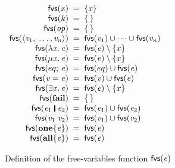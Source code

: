 \begin{figure}
$
\begin{array}{r@{\;\;}c@{\;\;}l@{\qquad}l}
  \freevars{\ensuremath{\Varid{x}}} & = & \{ \ensuremath{\Varid{x}} \} \\
  \freevars{\ensuremath{\Varid{k}}} & = & \{\,\} \\
  \freevars{\ensuremath{\Varid{op}}} & = & \{\,\} \\
  \freevars{\ensuremath{\langle{}\Varid{v}_{\mathrm{1}},\;\ldots,\Varid{v}_{\Varid{n}}\rangle}} & = & \freevars{\ensuremath{\Varid{v}_{\mathrm{1}}}} \cup \cdots \cup \freevars{\ensuremath{\Varid{v}_{\Varid{n}}}} \\
  \freevars{\ensuremath{\lambda\Varid{x}.\,\Varid{e}}} & = & \freevars{\ensuremath{\Varid{e}}} \setminus \{ x \} \\
  \freevars{\ensuremath{\mu\Varid{x}.\,\Varid{e}}} & = & \freevars{\ensuremath{\Varid{e}}} \setminus \{ x \} \\
  \freevars{\ensuremath{eq;\,\Varid{e}}} & = & \freevars{\ensuremath{eq}} \cup \freevars{\ensuremath{\Varid{e}}} \\
  \freevars{\ensuremath{\Varid{v}\mathrel{=}\Varid{e}}} & = & \freevars{\ensuremath{\Varid{v}}} \cup \freevars{\ensuremath{\Varid{e}}} \\
  \freevars{\ensuremath{\exists\Varid{x}.\,\Varid{e}}} & = & \freevars{\ensuremath{\Varid{e}}} \setminus \{ x \} \\
  \freevars{\ensuremath{\textbf{fail}}} & = & \{\,\}  \\
  \freevars{\ensuremath{\Varid{e}_{\mathrm{1}}\;\rule[-0.1em]{0.15em}{0.75em}\;\Varid{e}_{\mathrm{2}}}} & = & \freevars{\ensuremath{\Varid{e}_{\mathrm{1}}}} \cup \freevars{\ensuremath{\Varid{e}_{\mathrm{2}}}} \\
  \freevars{\ensuremath{\Varid{v}_{\mathrm{1}}\;\Varid{v}_{\mathrm{2}}}} & = & \freevars{\ensuremath{\Varid{v}_{\mathrm{1}}}} \cup \freevars{\ensuremath{\Varid{v}_{\mathrm{2}}}} \\
  \freevars{\ensuremath{\textbf{one}\{\Varid{e}\}}} & = & \freevars{\ensuremath{\Varid{e}}} \\
  \freevars{\ensuremath{\textbf{all}\{\Varid{e}\}}} & = & \freevars{\ensuremath{\Varid{e}}} \\
\end{array}
$
\caption{Definition of the free-variables function $\mathsf{fvs}(\mathit{e})$}\label{fig:fvs}
\end{figure}

